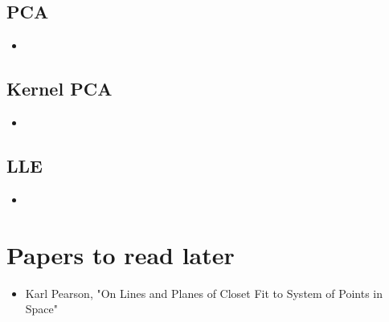 \documentclass{article}
\begin{document}
	\subsection{PCA}
	\begin{itemize}
		\item 
	\end{itemize}
	\subsection{Kernel PCA}
	\begin{itemize}
		\item 
	\end{itemize}
	\subsection{LLE}
	\begin{itemize}
		\item 
	\end{itemize}									
    \section*{Papers to read later}
    \begin{itemize}
    	\item Karl Pearson, "On Lines and Planes of Closet Fit to System of Points in Space"
    \end{itemize}
\end{document}
